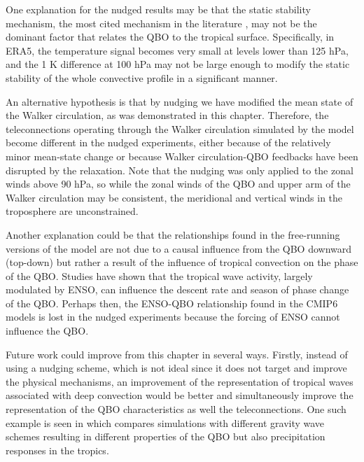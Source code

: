 One explanation for the nudged results may be that the static stability mechanism, the most cited mechanism in the literature \citep{collimore2003,liess2012,nie2015,gray2018,lee2018}, may not be the dominant factor that relates the QBO to the tropical surface. 
Specifically, in ERA5, the temperature signal becomes very small at levels lower than 125 hPa, and the 1 K difference at 100 hPa may not be large enough to modify the static stability of the whole convective profile in a significant manner.

An alternative hypothesis is that by nudging we have modified the mean state of the Walker circulation, as was demonstrated in this chapter. Therefore, the teleconnections operating through the Walker circulation simulated by the model become different in the nudged experiments, either because of the relatively minor mean-state change or because Walker circulation-QBO feedbacks have been disrupted by the relaxation. Note that the nudging was only applied to the zonal winds above 90 hPa, so while the zonal winds of the QBO and upper arm of the Walker circulation may be consistent, the meridional and vertical winds in the troposphere are unconstrained.  

Another explanation could be that the relationships found in the free-running versions of the model are not due to a causal influence from the QBO downward (top-down) but rather a result of the influence of tropical convection on the phase of the QBO. Studies \citep[e.g.][]{schirber2015,christiansen2016} have shown that the tropical wave activity, largely modulated by ENSO, can influence the descent rate and season of phase change of the QBO. Perhaps then, the ENSO-QBO relationship found in the CMIP6 models is lost in the nudged experiments because the forcing of ENSO cannot influence the QBO. 

Future work could improve from this chapter in several ways. 
Firstly, instead of using a nudging scheme, which is not ideal since it does not target and improve the physical mechanisms,  an improvement of the representation of tropical waves associated with deep convection would be better and simultaneously improve the representation of the QBO characteristics as well the teleconnections. One such example is seen in \cite{serva2021} which compares simulations with different gravity wave schemes resulting in different properties of the QBO but also precipitation responses in the tropics.
 

